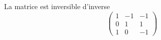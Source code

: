 La matrice est inversible d'inverse
\begin{displaymath}
\begin{pmatrix}
  1 & -1 & -1 \\ 0 & 1 & 1 \\ 1 & 0 & -1
\end{pmatrix}
\end{displaymath}

